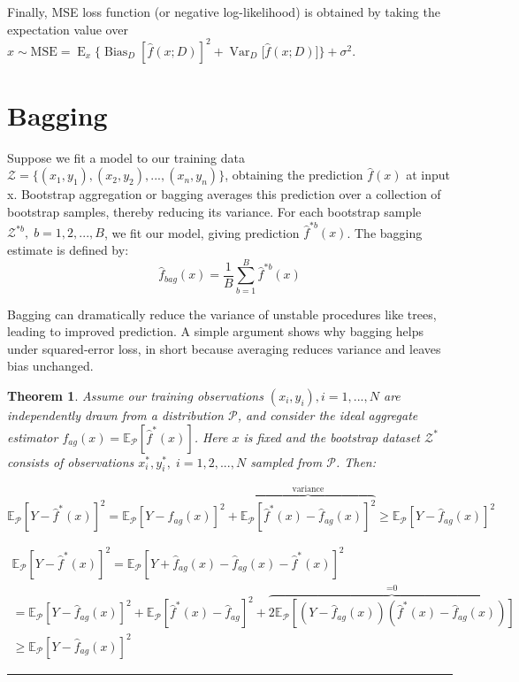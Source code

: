 \documentclass[twoside]{article}
\newcounter{lecnum}
\newtheorem{theorem}{Theorem}[lecnum]
\newenvironment{proof}{{\bf Proof:}}{\hfill\rule{2mm}{2mm}}
\begin{document}
Finally, MSE loss function (or negative log-likelihood) is obtained by taking the expectation value over $x\sim
\text{MSE} = \operatorname{E}_x\bigg\{\operatorname{Bias}_D[\hat{f}(x;D)]^2+\operatorname{Var}_D\big[\hat{f}(x;D)\big]\bigg\} + \sigma^2.$


\section{Bagging} %
Suppose we fit a model to our training data $\mathcal{Z} = \{(x_{1},y_{1}),(x_{2},y_{2}),... ,(x_{n},y_{n})\}$, obtaining the prediction $\hat{f}(x)$ at input x. Bootstrap aggregation or bagging averages this prediction over a collection of bootstrap samples, thereby reducing its variance.
For each bootstrap sample $\boldsymbol{\mathcal{Z}}^{*b}, \; b = 1, 2,... ,B$, we fit our model, giving
prediction $\hat{f}^{*b}(x)$. The bagging estimate is defined by:
\begin{equation*}
    \hat{f}_{bag}(x) = \dfrac{1}{B} \sum_{b=1}^{B}\hat{f}^{*b}(x)
\end{equation*}


Bagging can dramatically reduce the variance of unstable procedures like trees, leading to improved prediction. A simple argument shows why bagging helps under squared-error loss, in short because averaging reduces variance and leaves bias unchanged.

\begin{theorem}

Assume our training observations $(x_{i},y_{i}), i = 1,... ,N $ are independently drawn from a distribution $\mathcal{P}$, and consider the ideal aggregate estimator $f_{ag}(x) = \mathbb{E}_{\mathcal{P}}[\hat{f}^*(x)]
$. Here $x$ is fixed and the bootstrap dataset $\boldsymbol{\mathcal{Z}^*}$
consists of observations $x_{i}^*,y_{i}^*, \;  i = 1, 2,... ,N$
sampled from $\mathcal{P}$.  Then:

\begin{equation*}
    \mathbb{E}_{\mathcal{P}}[Y - \hat{f}^*(x)]^2 = \mathbb{E}_{\mathcal{P}}[Y - \hat{f}_{ag}(x)]^2 + \overbrace{\mathbb{E}_{\mathcal{P}}[\hat{f}^*(x) -\hat{f}_{ag}(x) ]^2}^\text{variance}
    \geq \mathbb{E}_{\mathcal{P}}[Y - \hat{f}_{ag}(x)]^2
\end{equation*}

\end{theorem}

\begin{proof}
\begin{align*}
       \mathbb{E}_{\mathcal{P}}[Y - \hat{f}^*(x)]^2 = \mathbb{E}_{\mathcal{P}}[Y +  \hat{f}_{ag}(x)- \hat{f}_{ag}(x) - \hat{f}^*(x)]^2  \\
       = \mathbb{E}_{\mathcal{P}}[Y - \hat{f}_{ag}(x)]^2 + \mathbb{E}_{\mathcal{P}}[\hat{f}^*(x) - \hat{f}_{ag} ]^2 + \overbrace{2\mathbb{E}_{\mathcal{P}}[(Y-\hat{f}_{ag}(x))( \hat{f}^*(x) - \hat{f}_{ag}(x))]}^\text{=0} \\
       \geq \mathbb{E}_{\mathcal{P}}[Y - \hat{f}_{ag}(x)]^2
\end{align*}
\end{proof}
\end{document}

